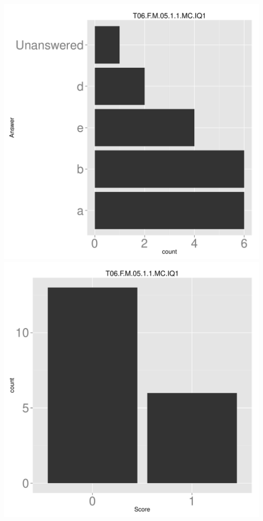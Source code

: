 \documentclass[12pt,nohyper]{tufte-handout}\usepackage[]{graphicx}\usepackage[]{color}
\begin{document}
\begin{center} \includegraphics[width=.45\linewidth]{Topic06_47_answer} \includegraphics[width=.45\linewidth]{Topic06_47_score} \end{center} 
\end{document}
